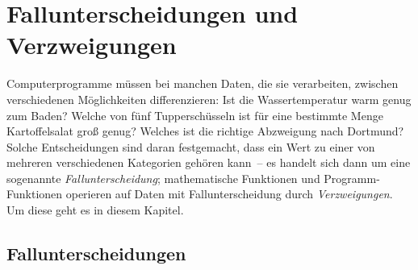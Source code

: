 

\chapter{Fallunterscheidungen und Verzweigungen}
\label{cha:conditionals}

Computerprogramme müssen bei manchen Daten, die sie
verarbeiten, zwischen verschiedenen Möglichkeiten differenzieren: Ist
die Wassertemperatur warm genug zum Baden?  Welche von fünf
Tupperschüsseln ist für eine bestimmte Menge Kartoffelsalat groß
genug?  Welches ist die richtige Abzweigung nach Dortmund?  Solche
Entscheidungen sind daran festgemacht, dass ein Wert zu einer von mehreren
verschiedenen 
Kategorien gehören kann~-- es handelt sich dann um eine sogenannte
\textit{Fallunterscheidung}; 
mathematische Funktionen und Programm-Funktionen operieren auf Daten mit
Fallunterscheidung durch \textit{Verzweigungen}.
Um diese geht es in diesem Kapitel.

\section{Fallunterscheidungen}
\label{sec:fallunterscheidungen}

